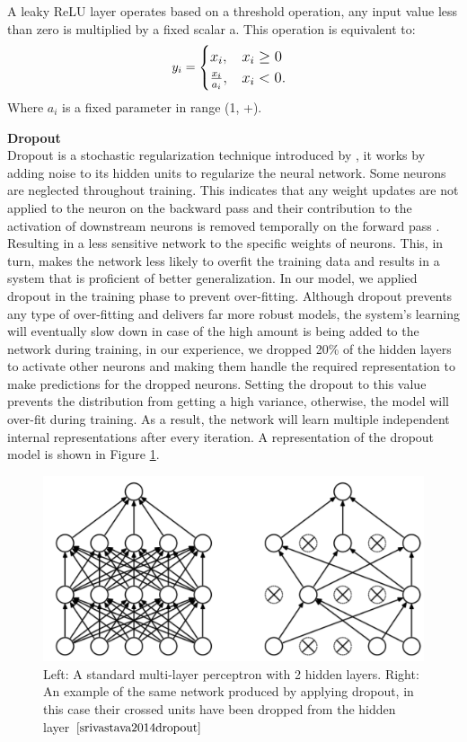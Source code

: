 \documentclass{vldb}
\begin{document}
A leaky ReLU layer operates based on a threshold operation, any input value less than zero is multiplied by a fixed scalar a. This operation is equivalent to:
\begin{align}
   & \large \large \ y_{i} = \begin{cases} x_{i}, & x_{i}\geq 0 \\ \frac{x_{i}}{a_{i}}, & x_{i}< 0. \end{cases}
\end{align}
Where $a_{i}$ is a fixed parameter in range (1, +\infty).\hfill

\textbf{Dropout}\\

Dropout is a stochastic regularization technique introduced by \cite{srivastava2014dropout}, it works by adding noise to its hidden units to regularize the neural network. Some neurons are neglected throughout training. This indicates that any weight updates are not applied to the neuron on the backward pass and their contribution to the activation of downstream neurons is removed temporally on the forward pass \cite{brownlee_2017}. Resulting in a less sensitive network to the specific weights of neurons. This, in turn, makes the network less likely to overfit the training data and results in a system that is proficient of better generalization.
In our model, we applied dropout in the training phase to prevent over-fitting. Although dropout prevents any type of over-fitting and delivers far more robust models, the system’s learning will eventually slow down in case of the high amount is being added to the network during training, in our experience, we dropped 20\% of the hidden layers to activate other neurons and making them handle the required representation to make predictions for the dropped neurons. Setting the dropout to this value prevents the distribution from getting a high variance, otherwise, the model will over-fit during training. As a result, the network will learn multiple independent internal representations after every iteration. A representation of the dropout model is shown in Figure \ref{fig:dropout}.



\begin{figure}[]
\includegraphics[width=0.98\columnwidth]{photo/do}
\caption{Left: A standard multi-layer perceptron with 2 hidden layers. Right: An example of the same network produced by applying dropout, in this case their crossed units have been dropped from the hidden layer $\cite{srivastava2014dropout}$}
\label{fig:dropout}
\end{figure}\hfill
\end{document}
